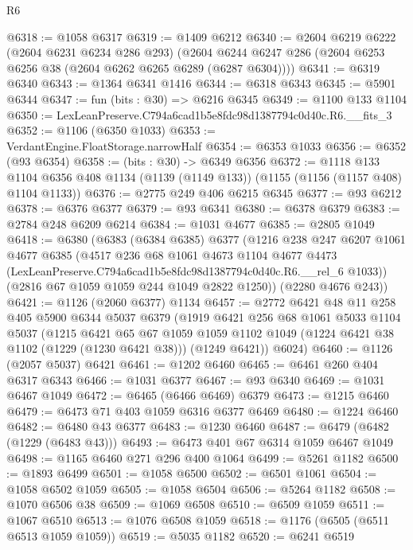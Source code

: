 \begin{lexlean}{R6}
\begin{coremodule}
@6318 := @1058 @6317
@6319 := @1409 @6212
@6340 := @2604
    @6219
    @6222
    (@2604 @6231 @6234 @286 @293)
    (@2604 @6244 @6247 @286 (@2604 @6253 @6256 @38 (@2604 @6262 @6265 @6289 (@6287 @6304))))
@6341 := @6319 @6340
@6343 := @1364 @6341 @1416
@6344 := @6318 @6343
@6345 := @5901 @6344
@6347 := fun (bits : @30) => @6216 @6345
@6349 := @1100 @133 @1104
@6350 := LexLeanPreserve.C794a6cad1b5e8fdc98d1387794c0d40c.R6.__fits_3
@6352 := @1106 (@6350 @1033)
@6353 := VerdantEngine.FloatStorage.narrowHalf
@6354 := @6353 @1033
@6356 := @6352 (@93 @6354)
@6358 := (bits : @30) -> @6349 @6356
@6372 := @1118
    @133
    @1104
    @6356
    @408
    @1134
    (@1139 (@1149 @133))
    (@1155 (@1156 (@1157 @408) @1104 @1133))
@6376 := @2775 @249 @406 @6215 @6345
@6377 := @93 @6212
@6378 := @6376 @6377
@6379 := @93 @6341
@6380 := @6378 @6379
@6383 := @2784 @248 @6209 @6214
@6384 := @1031 @4677
@6385 := @2805 @1049
@6418 := @6380
    (@6383
      (@6384 @6385)
      @6377
      (@1216
        @238
        @247
        @6207
        @1061
        @4677
        @6385
        (@4517
          @236
          @68
          @1061
          @4673
          @1104
          @4677
          @4473
          (LexLeanPreserve.C794a6cad1b5e8fdc98d1387794c0d40c.R6.__rel_6 @1033))
        (@2816 @67 @1059 @1059 @244 @1049 @2822 @1250))
      (@2280 @4676 @243))
@6421 := @1126 (@2060 @6377) @1134
@6457 := @2772
    @6421
    @48
    @11
    @258
    @405
    @5900
    @6344
    @5037
    @6379
    (@1919
      @6421
      @256
      @68
      @1061
      @5033
      @1104
      @5037
      (@1215
        @6421
        @65
        @67
        @1059
        @1059
        @1102
        @1049
        (@1224 @6421 @38 @1102 (@1229 (@1230 @6421 @38)))
        (@1249 @6421))
      @6024)
@6460 := @1126 (@2057 @5037) @6421
@6461 := @1202 @6460
@6465 := @6461 @260 @404 @6317 @6343
@6466 := @1031 @6377
@6467 := @93 @6340
@6469 := @1031 @6467 @1049
@6472 := @6465 (@6466 @6469) @6379
@6473 := @1215 @6460
@6479 := @6473 @71 @403 @1059 @6316 @6377 @6469
@6480 := @1224 @6460
@6482 := @6480 @43 @6377
@6483 := @1230 @6460
@6487 := @6479 (@6482 (@1229 (@6483 @43)))
@6493 := @6473 @401 @67 @6314 @1059 @6467 @1049
@6498 := @1165 @6460 @271 @296 @400 @1064
@6499 := @5261 @1182
@6500 := @1893 @6499
@6501 := @1058 @6500
@6502 := @6501 @1061
@6504 := @1058 @6502 @1059
@6505 := @1058 @6504
@6506 := @5264 @1182
@6508 := @1070 @6506 @38
@6509 := @1069 @6508
@6510 := @6509 @1059
@6511 := @1067 @6510
@6513 := @1076 @6508 @1059
@6518 := @1176 (@6505 (@6511 @6513 @1059 @1059))
@6519 := @5035 @1182
@6520 := @6241 @6519

\end{coremodule}
\end{lexlean}
